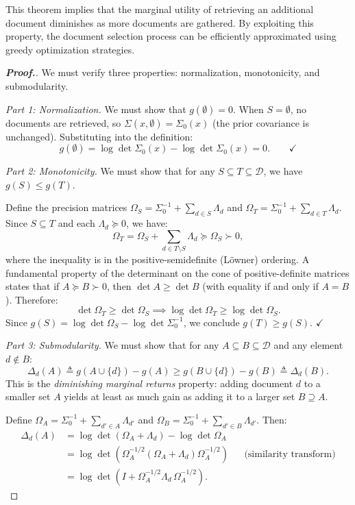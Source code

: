 \documentclass[12pt,a4paper,oneside]{report}
\theoremstyle{definition}
\theoremstyle{remark}
\begin{document}
This theorem implies that the marginal utility of retrieving an additional document diminishes as more documents are gathered. By exploiting this property, the document selection process can be efficiently approximated using greedy optimization strategies.

\begin{proof}[\textbf{Proof.}]
We must verify three properties: normalization, monotonicity, and submodularity.

\medskip
\noindent\textit{Part 1: Normalization.}
We must show that $g(\emptyset) = 0$. When $S = \emptyset$, no documents are retrieved, so $\Sigma(x, \emptyset) = \Sigma_0(x)$ (the prior covariance is unchanged). Substituting into the definition:
\[
g(\emptyset) = \log \det \Sigma_0(x) - \log \det \Sigma_0(x) = 0. \qquad \checkmark
\]

\medskip
\noindent\textit{Part 2: Monotonicity.}
We must show that for any $S \subseteq T \subseteq \mathcal{D}$, we have $g(S) \leq g(T)$.

Define the precision matrices $\Omega_S = \Sigma_0^{-1} + \sum_{d \in S} \Lambda_d$ and $\Omega_T = \Sigma_0^{-1} + \sum_{d \in T} \Lambda_d$. Since $S \subseteq T$ and each $\Lambda_d \succeq 0$, we have:
\[
\Omega_T = \Omega_S + \sum_{d \in T \setminus S} \Lambda_d \succeq \Omega_S \succ 0,
\]
where the inequality is in the positive-semidefinite (L\"owner) ordering. A fundamental property of the determinant on the cone of positive-definite matrices states that if $A \succeq B \succ 0$, then $\det A \geq \det B$ (with equality if and only if $A = B$). Therefore:
\[
\det \Omega_T \geq \det \Omega_S \implies \log \det \Omega_T \geq \log \det \Omega_S.
\]
Since $g(S) = \log \det \Omega_S - \log \det \Sigma_0^{-1}$, we conclude $g(T) \geq g(S)$. $\checkmark$

\medskip
\noindent\textit{Part 3: Submodularity.}
We must show that for any $A \subseteq B \subseteq \mathcal{D}$ and any element $d \notin B$:
\[
\Delta_d(A) \triangleq g(A \cup \{d\}) - g(A) \geq g(B \cup \{d\}) - g(B) \triangleq \Delta_d(B).
\]
This is the \emph{diminishing marginal returns} property: adding document $d$ to a smaller set $A$ yields at least as much gain as adding it to a larger set $B \supseteq A$.

Define $\Omega_A = \Sigma_0^{-1} + \sum_{d' \in A} \Lambda_{d'}$ and $\Omega_B = \Sigma_0^{-1} + \sum_{d' \in B} \Lambda_{d'}$. Then:
\begin{align*}
\Delta_d(A) &= \log \det(\Omega_A + \Lambda_d) - \log \det \Omega_A \\
&= \log \det\left(\Omega_A^{-1/2}(\Omega_A + \Lambda_d)\Omega_A^{-1/2}\right) && \text{(similarity transform)} \\
&= \log \det\left(I + \Omega_A^{-1/2} \Lambda_d \, \Omega_A^{-1/2}\right).
\end{align*}


\end{proof}
\end{document}
